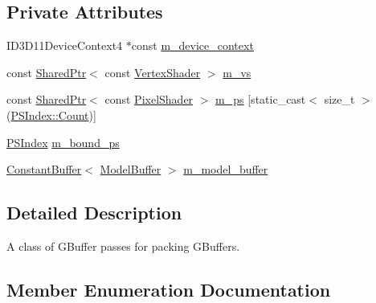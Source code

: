\subsection*{Private Attributes}
\begin{DoxyCompactItemize}
\item 
I\+D3\+D11\+Device\+Context4 $\ast$const \hyperlink{classmage_1_1_g_buffer_pass_a56bcb08adf8a9b04a15efe24ef703c32}{m\+\_\+device\+\_\+context}
\item 
const \hyperlink{namespacemage_a1e01ae66713838a7a67d30e44c67703e}{Shared\+Ptr}$<$ const \hyperlink{classmage_1_1_vertex_shader}{Vertex\+Shader} $>$ \hyperlink{classmage_1_1_g_buffer_pass_a5baced2ca3d5018e35d25d6c1b5d8f20}{m\+\_\+vs}
\item 
const \hyperlink{namespacemage_a1e01ae66713838a7a67d30e44c67703e}{Shared\+Ptr}$<$ const \hyperlink{namespacemage_a27ecaf266420ee7a494d64edc0757129}{Pixel\+Shader} $>$ \hyperlink{classmage_1_1_g_buffer_pass_ae607b9a6dab89d45865dc0ede3212fcd}{m\+\_\+ps} \mbox{[}static\+\_\+cast$<$ size\+\_\+t $>$(\hyperlink{classmage_1_1_g_buffer_pass_a23039b6695c10c88676c38fe63123571ae93f994f01c537c4e2f7d8528c3eb5e9}{P\+S\+Index\+::\+Count})\mbox{]}
\item 
\hyperlink{classmage_1_1_g_buffer_pass_a23039b6695c10c88676c38fe63123571}{P\+S\+Index} \hyperlink{classmage_1_1_g_buffer_pass_aef8452f64c9815d002e552957ed9e342}{m\+\_\+bound\+\_\+ps}
\item 
\hyperlink{classmage_1_1_constant_buffer}{Constant\+Buffer}$<$ \hyperlink{structmage_1_1_model_buffer}{Model\+Buffer} $>$ \hyperlink{classmage_1_1_g_buffer_pass_a0538769957df6740993dbb479b7e05a2}{m\+\_\+model\+\_\+buffer}
\end{DoxyCompactItemize}


\subsection{Detailed Description}
A class of G\+Buffer passes for packing G\+Buffers. 

\subsection{Member Enumeration Documentation}
\hypertarget{classmage_1_1_g_buffer_pass_a23039b6695c10c88676c38fe63123571}{}\label{classmage_1_1_g_buffer_pass_a23039b6695c10c88676c38fe63123571} 

